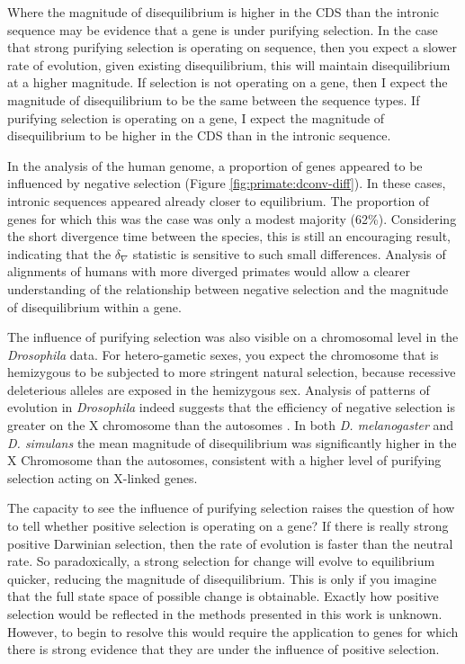 Where the magnitude of disequilibrium is higher in the CDS than the intronic sequence may be evidence that a gene is under purifying selection. In the case that strong purifying selection is operating on sequence, then you expect a slower rate of evolution, given existing disequilibrium, this will maintain disequilibrium at a higher magnitude.  If selection is not operating on a gene, then I expect the magnitude of disequilibrium to be the same between the sequence types. If purifying selection is operating on a gene, I expect the magnitude of disequilibrium to be higher in the CDS than in the intronic sequence.  

In the analysis of the human genome, a proportion of genes appeared to be influenced by negative selection (Figure \ref{fig:primate:dconv-diff}). In these cases, intronic sequences appeared already closer to equilibrium. The proportion of genes for which this was the case was only a modest majority (62\%). Considering the short divergence time between the species, this is still an encouraging result, indicating that the $\delta_\nabla$ statistic is sensitive to such small differences. Analysis of alignments of humans with more diverged primates would allow a clearer understanding of the relationship between negative selection and the magnitude of disequilibrium within a gene. 

The influence of purifying selection was also visible on a chromosomal level in the \textit{Drosophila} data. For hetero-gametic sexes, you expect the chromosome that is hemizygous to be subjected to more stringent natural selection, because recessive deleterious alleles are exposed in the hemizygous sex. Analysis of patterns of evolution in \textit{Drosophila} indeed suggests that the efficiency of negative selection is greater on the X chromosome than the autosomes \citep{Singh2008ContrastingDrosophila}. In both \textit{D. melanogaster} and \textit{D. simulans} the mean magnitude of disequilibrium was significantly higher in the X Chromosome than the autosomes, consistent with a higher level of purifying selection acting on X-linked genes. 

The capacity to see the influence of purifying selection raises the question of how to tell whether positive selection is operating on a gene? If there is really strong positive Darwinian selection, then the rate of evolution is faster than the neutral rate. So paradoxically, a strong selection for change will evolve to equilibrium quicker, reducing the magnitude of disequilibrium. This is only if you imagine that the full state space of possible change is obtainable. Exactly how positive selection would be reflected in the methods presented in this work is unknown. However, to begin to resolve this would require the application to genes for which there is strong evidence that they are under the influence of positive selection. 

